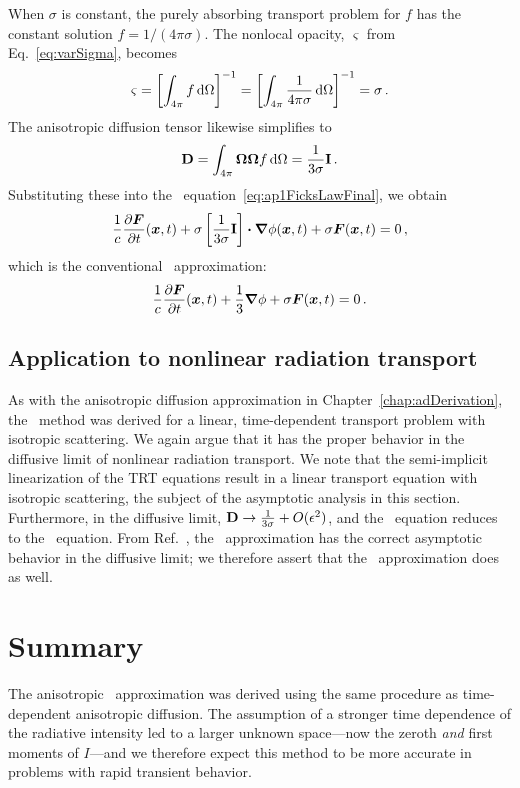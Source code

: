 When $\sigma$ is constant, the purely absorbing transport problem for $f$ has the
constant solution $f=1/(4\pi\sigma)$. The nonlocal opacity, $\varsigma$ from
Eq.~\eqref{eq:varSigma}, becomes
\begin{equation*}
  \varsigma
  = \left[ \int_{4\pi} f \mathop{}\!\mathrm{d} \Omega \right]^{-1}
  = \left[ \int_{4\pi} \frac{1}{4\pi\sigma} \mathop{}\!\mathrm{d} \Omega \right]^{-1}
  = \sigma \,.
\end{equation*}
The anisotropic diffusion tensor likewise simplifies to
\begin{equation*}
  \mathbf{D} = \int_{4\pi} \bm{\Omega}\bm{\Omega} f \mathop{}\!\mathrm{d} \Omega =
  \frac{1}{3\sigma}\mathbf{I} \,.
\end{equation*}
Substituting these into the \APone\ equation~\eqref{eq:ap1FicksLawFinal}, we obtain
\begin{equation*}
  \frac{1}{c}\frac{\partial \bm{F}}{\partial t}(\bm{x},t)
  + \sigma \left[ \frac{1}{3\sigma}\mathbf{I} \right] \bm{\cdot} \bm{\nabla} \phi(\bm{x}, t)
  + \sigma\bm{F}(\bm{x},t) 
  = 0 \,,
\end{equation*}
which is the conventional \Pone\ approximation:
\begin{equation*}
  \frac{1}{c}\frac{\partial \bm{F}}{\partial t}(\bm{x},t) + \frac{1}{3} \bm{\nabla} \phi
  + \sigma\bm{F}(\bm{x},t) 
  = 0\,.
\end{equation*}

\subsection{Application to nonlinear radiation transport}

As with the anisotropic diffusion approximation in
Chapter~\ref{chap:adDerivation}, the \APone\ method was derived for a linear,
time-dependent transport problem with isotropic scattering. We again argue that
it has the proper behavior in the diffusive limit of nonlinear radiation
transport. We note that the semi-implicit linearization of the TRT
equations result in a linear transport equation with isotropic scattering, the
subject of the asymptotic analysis in this section.
Furthermore, in the diffusive limit, $\mathbf{D} \to \frac{1}{3\sigma} +
O(\epsilon^2)$, and the \APone\ equation reduces to the \Pone\ equation. From
Ref.~\cite{Mor2000}, the \Pone\ approximation has the correct asymptotic behavior in
the diffusive limit; we therefore assert that the \APone\ approximation does
as well. 


\section{Summary}
The anisotropic \Pone\ approximation was derived using the same procedure as 
time-dependent anisotropic diffusion. The assumption of a stronger time
dependence of the radiative intensity led to a larger unknown space---now the
zeroth \emph{and} first moments of $I$---and we therefore expect this method to
be more accurate in problems with rapid transient behavior.


